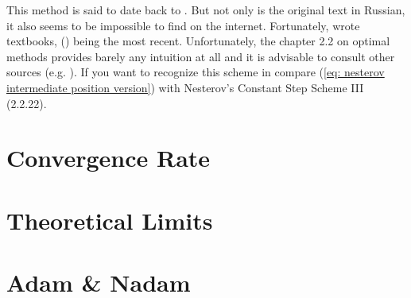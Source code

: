 %
\begin{remark}
	This method is said to date back to \textcite{nesterovMethodSolvingConvex1983}.
	But not only is the original text in Russian, it also seems to be impossible
	to find on the internet. Fortunately, \citeauthor{nesterovMethodSolvingConvex1983}
	wrote textbooks, 
	(\citeyear{nesterovLecturesConvexOptimization2018}) being the most recent.
	Unfortunately, the chapter 2.2 on optimal methods provides barely any
	intuition at all and it is advisable to consult other sources (e.g.
	\textcite{dontlooWhatDifferenceMomentum2016}). If you
	want to recognize this scheme in \textcite{nesterovLecturesConvexOptimization2018}
	compare (\ref{eq: nesterov intermediate position version}) with Nesterov's
	Constant Step Scheme III (2.2.22).
 \end{remark}



\section{Convergence Rate}

\section{Theoretical Limits}

\section{Adam \& Nadam}


\endinput
